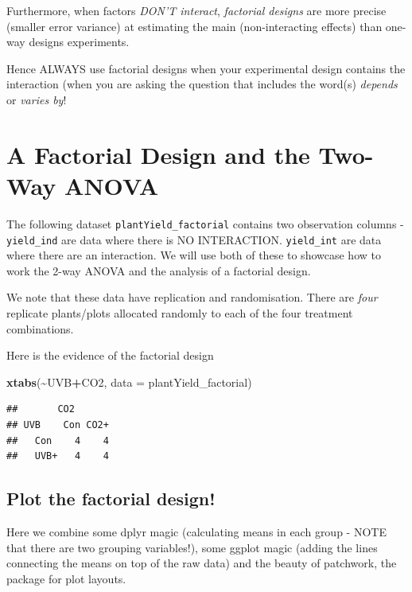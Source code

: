 \documentclass[
]{book}
\newenvironment{Shaded}{\begin{snugshade}}{\end{snugshade}}
\newcommand{\AttributeTok}[1]{\textcolor[rgb]{0.13,0.29,0.53}{#1}}
\newcommand{\FunctionTok}[1]{\textcolor[rgb]{0.13,0.29,0.53}{\textbf{#1}}}
\newcommand{\NormalTok}[1]{#1}
\newcommand{\SpecialCharTok}[1]{\textcolor[rgb]{0.81,0.36,0.00}{\textbf{#1}}}
\begin{document}
Furthermore, when factors \emph{DON'T interact}, \emph{factorial designs} are more precise (smaller error variance) at estimating the main (non-interacting effects) than one-way designs experiments.

Hence ALWAYS use factorial designs when your experimental design contains the interaction (when you are asking the question that includes the word(s) \emph{depends} or \emph{varies by}!

\section{A Factorial Design and the Two-Way ANOVA}\label{a-factorial-design-and-the-two-way-anova}

The following dataset \texttt{plantYield\_factorial} contains two observation columns - \texttt{yield\_ind} are data where there is NO INTERACTION. \texttt{yield\_int} are data where there are an interaction. We will use both of these to showcase how to work the 2-way ANOVA and the analysis of a factorial design.

We note that these data have replication and randomisation. There are \emph{four} replicate plants/plots allocated randomly to each of the four treatment combinations.

Here is the evidence of the factorial design

\begin{Shaded}
\begin{Highlighting}[]
\FunctionTok{xtabs}\NormalTok{(}\SpecialCharTok{\textasciitilde{}}\NormalTok{UVB}\SpecialCharTok{+}\NormalTok{CO2, }\AttributeTok{data =}\NormalTok{ plantYield\_factorial)}
\end{Highlighting}
\end{Shaded}

\begin{verbatim}
##       CO2
## UVB    Con CO2+
##   Con    4    4
##   UVB+   4    4
\end{verbatim}

\subsection{Plot the factorial design!}\label{plot-the-factorial-design}

Here we combine some dplyr magic (calculating means in each group - NOTE that there are two grouping variables!), some ggplot magic (adding the lines connecting the means on top of the raw data) and the beauty of patchwork, the package for plot layouts.
\end{document}
